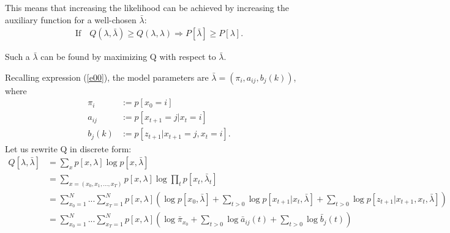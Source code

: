 \documentclass{article}
\begin{document}
This means that increasing the likelihood can be achieved by increasing the auxiliary function for a well-chosen $\bar \lambda$:
\begin{equation}
\begin{split}
\text{If} \quad Q(\lambda,\bar\lambda) \ge Q(\lambda,\lambda) \Rightarrow  
P[\bar \lambda] \ge P[\lambda].
\end{split}
\end{equation}

Such a $\bar \lambda$ can be found by maximizing Q with respect to $\bar \lambda$. 

Recalling expression (\ref{e00}), the model parameters are $\bar \lambda = (\pi_i, a_{ij}, b_{j}(k)) $, where 
\begin{equation} 
\begin{split}
                \pi_i & := p[x_0 = i]\\
                 a_{ij} &:= p[x_{t+1} = j|x_t = i]\\
                 b_{j}(k) & := p[z_{t+1}|x_{t+1}=j,x_t=i].
\end{split}
\end{equation}
Let us rewrite Q in discrete form:
\begin{equation} 
\begin{split}
                Q[\lambda, \bar\lambda ] &= \sum_x p[x,\lambda]\log p[x,\bar \lambda] \\
                &= \sum_{x = (x_0,x_1,...,x_T)} p[x,\lambda] \log \prod_t p[x_t,\bar \lambda_t]\\
                &= \sum_{x_0=1}^N ... \sum_{x_T=1}^N p[x,\lambda]  \left( \log p[x_0,\bar \lambda] + \sum_{t>0} \log p[x_{t+1}|x_t, \bar\lambda] + \sum_{t>0} \log p[z_{t+1}|x_{t+1},x_t, \bar \lambda] \right)\\
                &= \sum_{x_0=1}^N ... \sum_{x_T=1}^N p[x,\lambda]  \left( \log \bar \pi_{x_0} + \sum_{t>0} \log \bar a_{ij}(t) + \sum_{t>0} \log \bar b_j(t) \right)
\end{split}
\end{equation}
\end{document}
